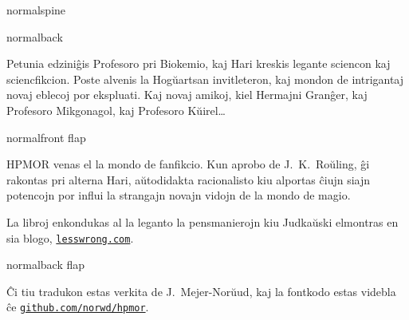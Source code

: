 \documentclass[12pt,coverwidth=\the\hpcoverwidth,coverheight=\the\hpcoverheight,spinewidth=\the\hpspinewidth,marklength=0mm,bleedwidth=5mm,flapwidth=63mm,esperanto]{bookcover}
\begin{document}
\begin{bookcover}

\begin{bookcoverelement}{normal}{spine}
\centering
\color{white}\scshape
\vspace{0.5cm}\huge \volumenumber\\[2ex]\Large
\vfill
{}
\vfill
\end{bookcoverelement}

\begin{bookcoverelement}{normal}{back}
  \centering
  \vspace{20mm}
  \parbox{110mm}{\color{white}\Large\raggedright
Petunia edziniĝis Profesoro pri Biokemio, kaj Hari kreskis legante sciencon kaj sciencfikcion. Poste alvenis la Hogŭartsan invitleteron, kaj mondon de intrigantaj novaj eblecoj por ekspluati. Kaj novaj amikoj, kiel Hermajni Granĝer, kaj Profesoro Mikgonagol, kaj Profesoro Kŭirel…
}
\end{bookcoverelement}

\begin{bookcoverelement}{normal}{front flap}
\centering
\vspace{20mm}
\parbox{40mm}{\color{white}\raggedright\small
  HPMOR venas el la mondo de fanfikcio. Kun aprobo de J.~K.~Roŭling, ĝi rakontas pri alterna Hari, aŭtodidakta racionalisto kiu alportas ĉiujn siajn potencojn por influi la strangajn novajn vidojn de la mondo de magio.

  \bigskip La libroj enkondukas al la leganto la pensmanierojn kiu Judkaŭski elmontras en sia blogo, \href{https://lesswrong.com}{\texttt{lesswrong.com}}.}
\end{bookcoverelement}

\begin{bookcoverelement}{normal}{back flap}
\centering
\vspace{20mm}
\parbox{40mm}{\color{white}\small\raggedright
  Ĉi tiu tradukon estas verkita de J.~Mejer\nobreakdash-Norŭud, kaj la fontkodo estas videbla ĉe \href{https://github.com/norwd/hpmor}{\texttt{github.com/norwd/hpmor}}.
}
\end{bookcoverelement}

\end{bookcover}
\end{document}
